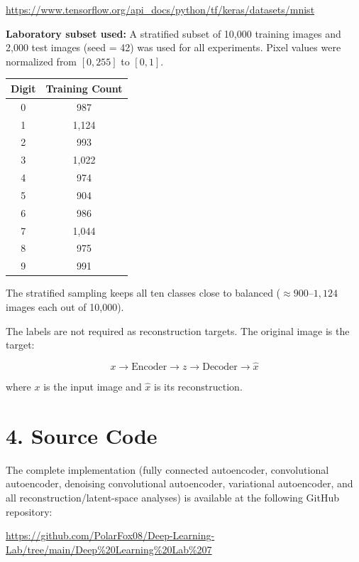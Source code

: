 \documentclass[10pt]{article}
\begin{document}
\url{https://www.tensorflow.org/api_docs/python/tf/keras/datasets/mnist}

\textbf{Laboratory subset used:} A stratified subset of 10,000 training
images and 2,000 test images (seed = 42) was used for all experiments.
Pixel values were normalized from $[0,255]$ to $[0,1]$.

\begin{center}
\begin{tabular}{|c|c|}
\hline
Digit & Training Count\\
\hline
0 & 987\\
1 & 1{,}124\\
2 & 993\\
3 & 1{,}022\\
4 & 974\\
5 & 904\\
6 & 986\\
7 & 1{,}044\\
8 & 975\\
9 & 991\\
\hline
\end{tabular}
\end{center}

The stratified sampling keeps all ten classes close to balanced
($\approx900$--$1{,}124$ images each out of 10,000).

The labels are not required as reconstruction targets. The original image is
the target:

\[
\boxed{x\rightarrow \text{Encoder}\rightarrow z
\rightarrow\text{Decoder}\rightarrow\hat{x}}
\]

where $x$ is the input image and $\hat{x}$ is its reconstruction.

\section*{4. Source Code}

The complete implementation (fully connected autoencoder, convolutional
autoencoder, denoising convolutional autoencoder, variational autoencoder,
and all reconstruction/latent-space analyses) is available at the following
GitHub repository:

\begin{center}
\url{https://github.com/PolarFox08/Deep-Learning-Lab/tree/main/Deep%20Learning%20Lab%207}
\end{center}

\end{document}
